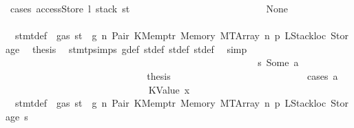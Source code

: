 \begin{isabellebody}
\ {\isacharparenleft}{\kern0pt}cases\ {\isachardoublequoteopen}accessStore\ l\ {\isacharparenleft}{\kern0pt}stack\ st{\isacharprime}{\kern0pt}{\isacharprime}{\kern0pt}{\isacharprime}{\kern0pt}{\isacharparenright}{\kern0pt}{\isachardoublequoteclose}{\isacharparenright}{\kern0pt}\isanewline
\ \ \ \ \ \ \ \ \ \ \ \ \ \ \ \ \ \ \ \ \ \ \ \ \ \ \isamarkupfalse%
\ None\isanewline
\ \ \ \ \ \ \ \ \ \ \ \ \ \ \ \ \ \ \ \ \ \ \ \ \ \ \isamarkupfalse%
\ {}{\isacharparenleft}{\kern0pt}{}{\isacharparenright}{\kern0pt}\ stmt{\isacharunderscore}{\kern0pt}def\ {\isacharbackquoteopen}{\isasymnot}\ gas\ st\ {\isasymle}\ g{\isacharbackquoteclose}\ n\ Pair\ KMemptr\ Memory\ MTArray\ n{}\ p{}\ LStackloc\ Storage\ \isamarkupfalse%
\ {\isacharquery}{\kern0pt}thesis\ \isamarkupfalse%
\ stmt{\isachardot}{\kern0pt}psimps{\isacharparenleft}{\kern0pt}{}{\isacharparenright}{\kern0pt}\ g{\isacharunderscore}{\kern0pt}def\ st{\isacharprime}{\kern0pt}{\isacharunderscore}{\kern0pt}def\ st{\isacharprime}{\kern0pt}{\isacharprime}{\kern0pt}{\isacharunderscore}{\kern0pt}def\ st{\isacharprime}{\kern0pt}{\isacharprime}{\kern0pt}{\isacharprime}{\kern0pt}{\isacharunderscore}{\kern0pt}def\ \isamarkupfalse%
\ simp\isanewline
\ \ \ \ \ \ \ \ \ \ \ \ \ \ \ \ \ \ \ \ \ \ \ \ \isamarkupfalse%
\isanewline
\ \ \ \ \ \ \ \ \ \ \ \ \ \ \ \ \ \ \ \ \ \ \ \ \ \ \isamarkupfalse%
\ s{}{\isacharcolon}{\kern0pt}\ {\isacharparenleft}{\kern0pt}Some\ a{\isacharparenright}{\kern0pt}\isanewline
\ \ \ \ \ \ \ \ \ \ \ \ \ \ \ \ \ \ \ \ \ \ \ \ \ \ \isamarkupfalse%
\ \isamarkupfalse%
\ {\isacharquery}{\kern0pt}thesis\isanewline
\ \ \ \ \ \ \ \ \ \ \ \ \ \ \ \ \ \ \ \ \ \ \ \ \ \ \isamarkupfalse%
\ {\isacharparenleft}{\kern0pt}cases\ a{\isacharparenright}{\kern0pt}\isanewline
\ \ \ \ \ \ \ \ \ \ \ \ \ \ \ \ \ \ \ \ \ \ \ \ \ \ \ \ \isamarkupfalse%
\ {\isacharparenleft}{\kern0pt}KValue\ x{}{\isacharparenright}{\kern0pt}\isanewline
\ \ \ \ \ \ \ \ \ \ \ \ \ \ \ \ \ \ \ \ \ \ \ \ \ \ \ \ \isamarkupfalse%
\ {}{\isacharparenleft}{\kern0pt}{}{\isacharparenright}{\kern0pt}\ stmt{\isacharunderscore}{\kern0pt}def\ {\isacharbackquoteopen}{\isasymnot}\ gas\ st\ {\isasymle}\ g{\isacharbackquoteclose}\ n\ Pair\ KMemptr\ Memory\ MTArray\ n{}\ p{}\ LStackloc\ Storage\ s{}\ \isamarkupfalse%

\end{isabellebody}
